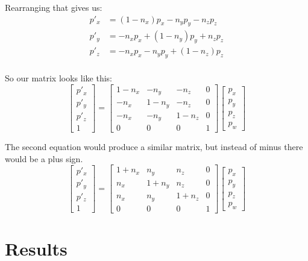 \documentclass[]{report}   %
\begin{document}
Rearranging that gives us:
\begin{align*}
	p\prime_x &= (1 - n_x) p_x - n_y p_y - n_z p_z		\\
	p\prime_y &= - n_x p_x + (1 -n_y) p_y + n_z p_z		\\
	p\prime_z &= - n_x p_x - n_y p_y + (1 - n_z) p_z	\\
\end{align*}

So our matrix looks like this:
\[
	\begin{bmatrix}
	p\prime_x \\
	p\prime_y \\
	p\prime_z \\
	1
	\end{bmatrix}
	=
	\begin{bmatrix}
	1 - n_x			&	- n_y		&	- n_z		&	0	\\
	- n_x			&	1 -n_y		&	- n_z		&	0	\\
	- n_x			&	- n_y		&	1 - n_z		&	0	\\
		0			&	0			&	0			&	1
	\end{bmatrix}
	\begin{bmatrix}
	p_x \\
	p_y \\
	p_z \\
	p_w
	\end{bmatrix}	
\]

The second equation would produce a similar matrix, but instead of minus there would be a plus sign.
\[
	\begin{bmatrix}
	p\prime_x \\
	p\prime_y \\
	p\prime_z \\
	1
	\end{bmatrix}
	=
	\begin{bmatrix}
	1 + n_x		&	n_y		&	n_z		&	0	\\
	n_x			&	1 +n_y	&	n_z		&	0	\\
	n_x			&	n_y		&	1 + n_z	&	0	\\
		0		&	0		&	0		&	1
	\end{bmatrix}
	\begin{bmatrix}
	p_x \\
	p_y \\
	p_z \\
	p_w
	\end{bmatrix}	
\]


\chapter{Results}           %
\end{document}
